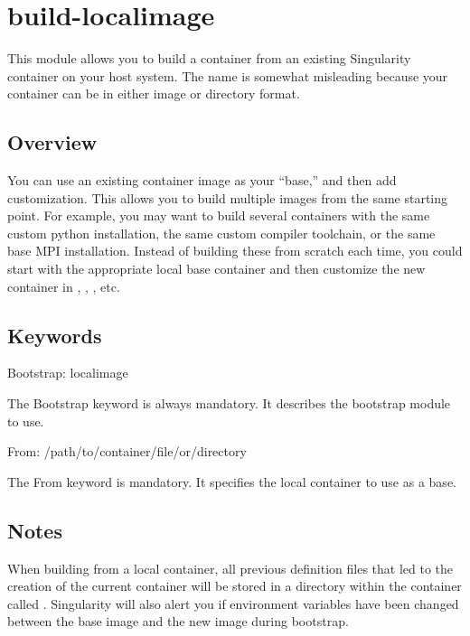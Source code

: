 \documentclass[letterpaper,10pt,english]{sphinxmanual}
\begin{document}
\section{build-localimage}
\label{\detokenize{appendix:build-localimage}}\label{\detokenize{appendix:id6}}\label{\detokenize{appendix:sec-build-localimage}}
This module allows you to build a container from an existing Singularity container on your host system. The name is somewhat misleading
because your container can be in either image or directory format.


\subsection{Overview}
\label{\detokenize{appendix:id7}}
You can use an existing container image as your “base,” and then add customization. This allows you to build multiple images from the same
starting point. For example, you may want to build several containers with the same custom python installation, the same custom compiler
toolchain, or the same base MPI installation. Instead of building these from scratch each time, you could start with the appropriate local
base container and then customize the new container in , , , etc.


\subsection{Keywords}
\label{\detokenize{appendix:id8}}
%
\begin{sphinxVerbatim}[commandchars=\\\{\}]
Bootstrap: localimage
\end{sphinxVerbatim}

The Bootstrap keyword is always mandatory. It describes the bootstrap module to use.

%
\begin{sphinxVerbatim}[commandchars=\\\{\}]
From: /path/to/container/file/or/directory
\end{sphinxVerbatim}

The From keyword is mandatory. It specifies the local container to use as a base.


\subsection{Notes}
\label{\detokenize{appendix:id9}}
When building from a local container, all previous definition files that led to the creation of the current container will be stored in a
directory within the container called . Singularity will also alert you if environment variables have been
changed between the base image and the new image during bootstrap.
\end{document}
